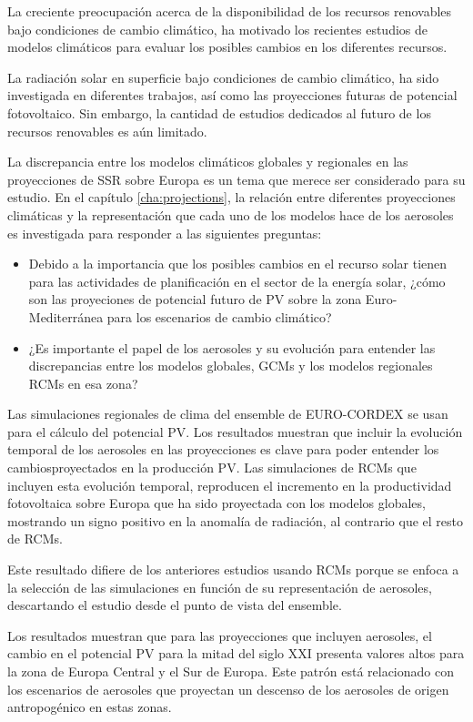 La creciente preocupación acerca de la disponibilidad de los recursos renovables bajo condiciones de cambio climático, ha motivado los recientes estudios de modelos climáticos para evaluar los posibles cambios en los diferentes recursos.

La radiación solar en superficie bajo condiciones de cambio climático, ha sido investigada en diferentes trabajos, así como las proyecciones futuras de potencial fotovoltaico. Sin embargo, la cantidad de estudios dedicados al futuro de los recursos renovables es aún limitado.

La discrepancia entre los modelos climáticos globales y regionales en las proyecciones de SSR sobre Europa es un tema que merece ser considerado para su estudio. En el capítulo \ref{cha:projections}, la relación entre diferentes proyecciones climáticas y la representación que cada uno de los modelos hace de los aerosoles es investigada para responder a las siguientes preguntas:

\begin{itemize}
\item Debido a la importancia que los posibles cambios en el recurso solar tienen para las actividades de planificación en el sector de la energía solar, ¿cómo son las proyeciones de potencial futuro de PV sobre la zona Euro-Mediterránea para los escenarios de cambio climático?
\item ¿Es importante el papel de los aerosoles y su evolución para entender las discrepancias entre los modelos globales, GCMs y los modelos regionales RCMs en esa zona?
\end{itemize}

Las simulaciones regionales de clima del ensemble de EURO-CORDEX se usan para el cálculo del potencial PV. Los resultados muestran que incluir la evolución temporal de los aerosoles en las proyecciones es clave para poder entender los cambiosproyectados en la producción PV. Las simulaciones de RCMs que incluyen esta evolución temporal, reproducen el incremento en la productividad fotovoltaica sobre Europa que ha sido proyectada con los modelos globales, mostrando un signo positivo en la anomalía de radiación, al contrario que el resto de RCMs.

Este resultado difiere de los anteriores estudios usando RCMs porque se enfoca a la selección de las simulaciones en función de su representación de aerosoles, descartando el estudio desde el punto de vista del ensemble.

Los resultados muestran que para las proyecciones que incluyen aerosoles, el cambio en el potencial PV para la mitad del siglo XXI presenta valores altos para la zona de Europa Central y el Sur de Europa. Este patrón está relacionado con los escenarios de aerosoles que proyectan un descenso de los aerosoles de origen antropogénico en estas zonas.


